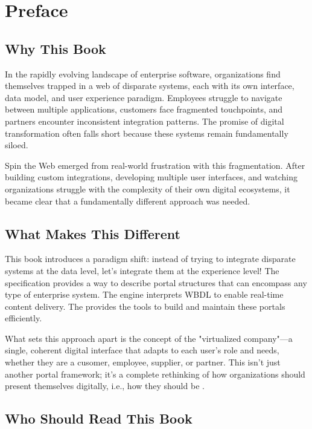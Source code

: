 
\chapter*{Preface}

\section*{Why This Book}

In the rapidly evolving landscape of enterprise software, organizations find themselves trapped in a web of disparate systems, each with its own interface, data model, and user experience paradigm. Employees struggle to navigate between multiple applications, customers face fragmented touchpoints, and partners encounter inconsistent integration patterns. The promise of digital transformation often falls short because these systems remain fundamentally siloed.

Spin the Web emerged from real-world frustration with this fragmentation. After building custom integrations, developing multiple user interfaces, and watching organizations struggle with the complexity of their own digital ecosystems, it became clear that a fundamentally different approach was needed.

\section*{What Makes This Different}

This book introduces a paradigm shift: instead of trying to integrate disparate systems at the data level, let's integrate them at the experience level! The \wbdl specification provides a way to describe portal structures that can encompass any type of enterprise system. The \webspinner engine interprets WBDL to enable real-time content delivery. The \studio provides the tools to build and maintain these portals efficiently.

What sets this approach apart is the concept of the "virtualized company"—a single, coherent digital interface that adapts to each user's role and needs, whether they are a cusomer, employee, supplier, or partner. This isn't just another portal framework; it's a complete rethinking of how organizations should present themselves digitally, i.e., how they should be \eBranded.

\section*{Who Should Read This Book}

